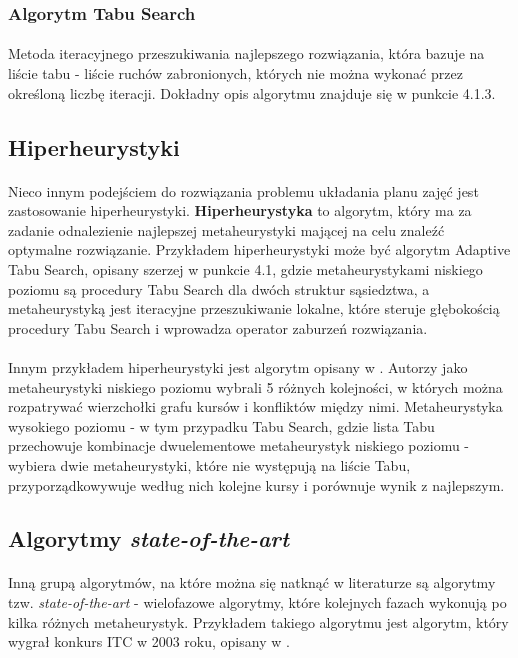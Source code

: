 \subsubsection{Algorytm Tabu Search}
\paragraph{} Metoda iteracyjnego przeszukiwania najlepszego rozwiązania, która bazuje na liście tabu - liście ruchów zabronionych, których nie można wykonać przez określoną liczbę iteracji. Dokładny opis algorytmu znajduje się w punkcie 4.1.3.

\subsection{Hiperheurystyki}
\paragraph{}Nieco innym podejściem do rozwiązania problemu układania planu zajęć jest zastosowanie hiperheurystyki. \textbf{Hiperheurystyka} to algorytm, który ma za zadanie odnalezienie najlepszej metaheurystyki mającej na celu znaleźć optymalne rozwiązanie. Przykładem hiperheurystyki może być algorytm Adaptive Tabu Search, opisany szerzej w punkcie 4.1, gdzie metaheurystykami niskiego poziomu są procedury Tabu Search dla dwóch struktur sąsiedztwa, a metaheurystyką jest iteracyjne przeszukiwanie lokalne, które steruje głębokością procedury Tabu Search i wprowadza operator zaburzeń rozwiązania.
\paragraph{}Innym przykładem hiperheurystyki jest algorytm opisany w \cite{gbhh}. Autorzy jako metaheurystyki niskiego poziomu wybrali 5 różnych kolejności, w których można rozpatrywać wierzchołki grafu kursów i konfliktów między nimi. Metaheurystyka wysokiego poziomu - w tym przypadku Tabu Search, gdzie lista Tabu przechowuje kombinacje dwuelementowe metaheurystyk niskiego poziomu - wybiera dwie metaheurystyki, które nie występują na liście Tabu, przyporządkowywuje według nich kolejne kursy i porównuje wynik z najlepszym.

\subsection{Algorytmy \textit{state-of-the-art}}

\paragraph{} Inną grupą algorytmów, na które można się natknąć w literaturze są algorytmy tzw. \textit{state-of-the-art} - wielofazowe algorytmy, które kolejnych fazach wykonują po kilka różnych metaheurystyk. Przykładem takiego algorytmu jest algorytm, który wygrał konkurs ITC w 2003 roku, opisany w \cite{kostuch}.


